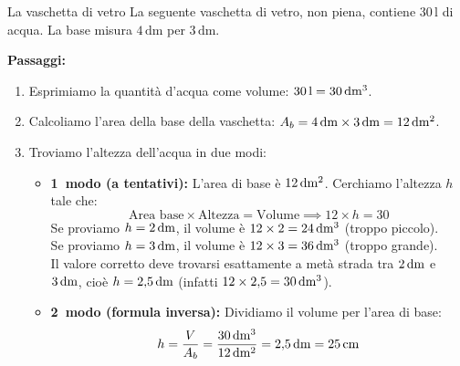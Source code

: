 \condnewpage

\begin{esercizio}{La vaschetta di vetro}
La seguente vaschetta di vetro, non piena, contiene $30\,\mathrm{l}$ di acqua. La base misura $4\,\mathrm{dm}$ per $3\,\mathrm{dm}$.



\responsespace{5.8cm}
\condnewpage

\begin{soluzione}
  \textbf{Passaggi:}
  \begin{enumerate}
    \item Esprimiamo la quantità d'acqua come volume: $30\,\mathrm{l} = 30\,\mathrm{dm^3}$.
    \item Calcoliamo l'area della base della vaschetta: $A_b = 4\,\mathrm{dm} \times 3\,\mathrm{dm} = 12\,\mathrm{dm^2}$.
    \item Troviamo l'altezza dell'acqua in due modi:
    \begin{itemize}
      \item \textbf{1\textdegree\ modo (a tentativi):} L'area di base è $12\,\mathrm{dm^2}$. Cerchiamo l'altezza $h$ tale che:
      \[
      \text{Area base} \times \text{Altezza} = \text{Volume} \implies 12 \times h = 30
      \]
      Se proviamo $h = 2\,\mathrm{dm}$, il volume è $12 \times 2 = 24\,\mathrm{dm^3}$ (troppo piccolo).\\
      Se proviamo $h = 3\,\mathrm{dm}$, il volume è $12 \times 3 = 36\,\mathrm{dm^3}$ (troppo grande).\\
      Il valore corretto deve trovarsi esattamente a metà strada tra $2\,\mathrm{dm}$ e $3\,\mathrm{dm}$, cioè $h = 2{,}5\,\mathrm{dm}$ (infatti $12 \times 2{,}5 = 30\,\mathrm{dm^3}$).
      \item \textbf{2\textdegree\ modo (formula inversa):} Dividiamo il volume per l'area di base:
      \[
      h = \frac{V}{A_b} = \frac{30\,\mathrm{dm^3}}{12\,\mathrm{dm^2}} = 2{,}5\,\mathrm{dm} = 25\,\mathrm{cm}
      \]
    \end{itemize}
  \end{enumerate}
\end{soluzione}
\end{esercizio}

